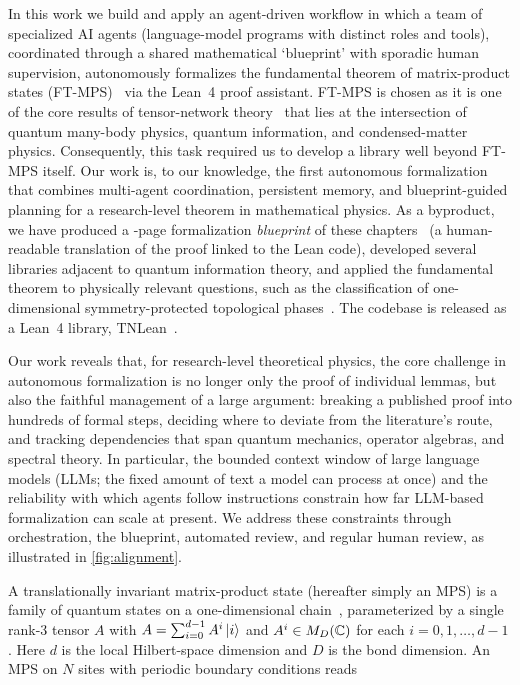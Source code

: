 \documentclass[aps,prl,twocolumn,superscriptaddress,longbibliography,10pt,footinbib]{revtex4-2}
\begin{document}
In this work we build and apply an agent-driven workflow in which a team of specialized AI agents (language-model programs with distinct roles and tools), coordinated through a shared mathematical `blueprint' with sporadic human supervision, autonomously formalizes the fundamental theorem of matrix-product states (FT-MPS)~\cite{Perez-Garcia2007Matrix,Cirac2017Matrixa,Cirac2021Matrix} via the Lean~4 proof assistant. FT-MPS is chosen as it is one of the core results of tensor-network theory~\cite{Cirac2021Matrix} that lies at the intersection of quantum many-body physics, quantum information, and condensed-matter physics. Consequently, this task required us to develop a library well beyond FT-MPS itself. Our work is, to our knowledge, the first autonomous formalization that combines multi-agent coordination, persistent memory, and blueprint-guided planning for a research-level theorem in mathematical physics. As a byproduct, we have produced a \nPagesBluePrint{}-page formalization \textit{blueprint} of these \nChapters{} chapters~\cite{Massot2021Leanblueprint,TNLeanBlueprint} (a human-readable translation of the proof linked to the Lean code), developed several libraries adjacent to quantum information theory, and applied the fundamental theorem to physically relevant questions, such as the classification of one-dimensional symmetry-protected topological phases~\cite{Chen2011Classification,Schuch2011Classifying,Pollmann2010Entanglement,Pollmann2012Symmetry}. The codebase is released as a Lean~4 library, TNLean~\cite{TNLean}.

Our work reveals that, for research-level theoretical physics, the core challenge in autonomous formalization is no longer only the proof of individual lemmas, but also the faithful management of a large argument: breaking a published proof into hundreds of formal steps, deciding where to deviate from the literature's route, and tracking dependencies that span quantum mechanics, operator algebras, and spectral theory. In particular, the bounded context window of large language models (LLMs; the fixed amount of text a model can process at once) and the reliability with which agents follow instructions constrain how far LLM-based formalization can scale at present. We address these constraints through orchestration, the blueprint, automated review, and regular human review, as illustrated in \cref{fig:alignment}.





%
A translationally invariant matrix-product state (hereafter simply an MPS) is a family of quantum states on a one-dimensional chain~\cite{Verstraete2006Matrix}, parameterized by a single rank-3 tensor $A$ with $A = \sum_{i=0}^{d-1}A^{i}\ket{i}$ and $A^i\in M_D(\mathbb{C})$ for each $i=0,1,\ldots,d-1$. Here $d$ is the local Hilbert-space dimension and $D$ is the bond dimension. An MPS on $N$ sites with periodic boundary conditions reads
\end{document}
